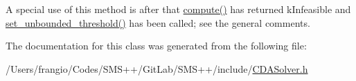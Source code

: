 A special use of this method is after that \mbox{\hyperlink{class_s_m_spp__di__unipi__it_1_1_solver_a504d4e3e174c7a518cc66156a8a45ce5}{compute()}} has returned k\+Infeasible and \mbox{\hyperlink{class_s_m_spp__di__unipi__it_1_1_solver_ae1717d1363782e086aa797e7437c0352}{set\+\_\+unbounded\+\_\+threshold()}} has been called; see the general comments. 

The documentation for this class was generated from the following file\+:\begin{DoxyCompactItemize}
\item 
/\+Users/frangio/\+Codes/\+S\+M\+S++/\+Git\+Lab/\+S\+M\+S++/include/\mbox{\hyperlink{_c_d_a_solver_8h}{C\+D\+A\+Solver.\+h}}\end{DoxyCompactItemize}
